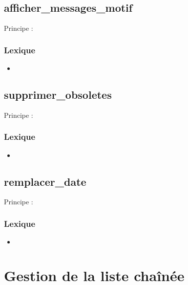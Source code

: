   \subsection{afficher\_messages\_motif}
    Principe :
  
    \subsubsection{Lexique}
      \begin{itemize}
        \item 
      \end{itemize}

  \subsection{supprimer\_obsoletes}
    Principe :

    \subsubsection{Lexique}
      \begin{itemize}
        \item 
      \end{itemize}

  \subsection{remplacer\_date}
    Principe :

    \subsubsection{Lexique}
      \begin{itemize}
        \item 
      \end{itemize}      

\section{Gestion de la liste chaînée}